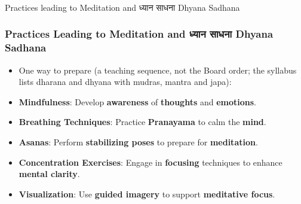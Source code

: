 


\begin{frame}[fragile]\frametitle{}
\begin{center}
{\Large Practices leading to Meditation and ध्यान साधना  Dhyana Sadhana }
\end{center}
\end{frame}

\begin{frame}[fragile]\frametitle{Practices Leading to Meditation and ध्यान साधना  Dhyana Sadhana}

      \begin{itemize}
        \item One way to prepare (a teaching sequence, not the Board order; the syllabus lists dharana and dhyana with mudras, mantra and japa):
        \item \textbf{Mindfulness}: Develop \textbf{awareness} of \textbf{thoughts} and \textbf{emotions}.
        \item \textbf{Breathing Techniques}: Practice \textbf{Pranayama} to calm the \textbf{mind}.
        \item \textbf{Asanas}: Perform \textbf{stabilizing poses} to prepare for \textbf{meditation}.
        \item \textbf{Concentration Exercises}: Engage in \textbf{focusing} techniques to enhance \textbf{mental clarity}.
        \item \textbf{Visualization}: Use \textbf{guided imagery} to support \textbf{meditative focus}.
      \end{itemize}
 
\end{frame}








